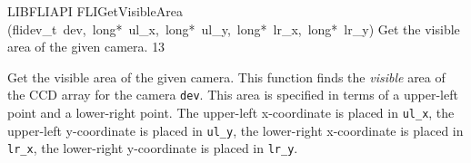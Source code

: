 \documentclass{article}
\begin{document}
\begin{cxxfunction}
{LIBFLIAPI}
        {FLIGetVisibleArea}
        {(flidev\_t\ dev,\ long*\ ul\_x,\ long*\ ul\_y,\ long*\ lr\_x,\ long*\ lr\_y)}
        {
 Get the visible area of the given camera.}
        {13}
\begin{cxxdoc}

Get the visible area of the given camera.  This function finds the
\emph{visible} area of the CCD array for the camera \texttt{dev}.
This area is specified in terms of a upper-left point and a
lower-right point.  The upper-left x-coordinate is placed in
\texttt{ul\_x}, the upper-left y-coordinate is placed in
\texttt{ul\_y}, the lower-right x-coordinate is placed in
\texttt{lr\_x}, the lower-right y-coordinate is placed in
\texttt{lr\_y}.


\end{cxxdoc}
\end{cxxfunction}
\end{document}

